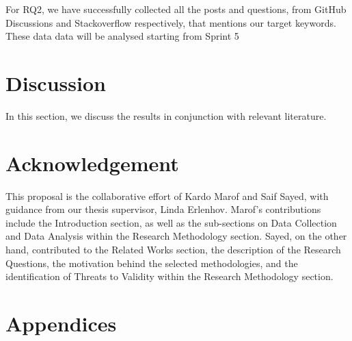 \documentclass[conference]{IEEEtran}
\begin{document}
For RQ2, we have successfully collected all the posts and questions, from GitHub Discussions and Stackoverflow respectively, that mentions our target keywords. These data data will be analysed starting from Sprint 5

\section{Discussion}
	
In this section, we discuss the results in conjunction with relevant literature.

\section{Acknowledgement}

         This proposal is the collaborative effort of Kardo Marof and Saif Sayed, with guidance from our thesis supervisor, Linda Erlenhov. Marof's contributions include the Introduction section, as well as the sub-sections on Data Collection and Data Analysis within the Research Methodology section. Sayed, on the other hand, contributed to the Related Works section, the description of the Research Questions, the motivation behind the selected methodologies, and the identification of Threats to Validity within the Research Methodology section.


\section{Appendices}
\end{document}
